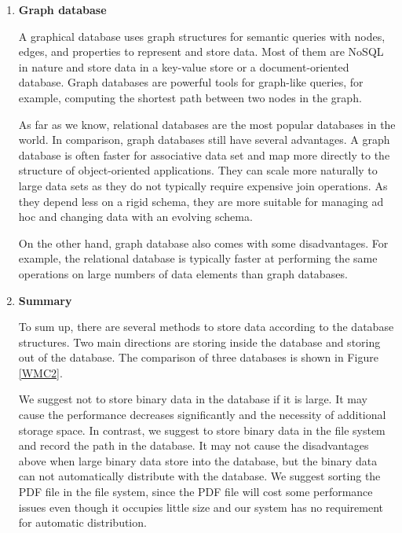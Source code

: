 \begin{enumerate}
	
	
	\item\textbf{Graph database}
	\setlength{\parindent}{1em}	
	
	A graphical database uses graph structures for semantic queries with nodes, edges, and properties to represent and store data.
	Most of them are NoSQL in nature and store data in a key-value store or a document-oriented database.
	Graph databases are powerful tools for graph-like queries, for example, computing the shortest path between two nodes in the graph.
	
	As far as we know, relational databases are the most popular databases in the world.
	In comparison, graph databases still have several advantages.
	A graph database is often faster for associative data set and map more directly to the structure of object-oriented applications.
	They can scale more naturally to large data sets as they do not typically require expensive join operations.
	As they depend less on a rigid schema, they are more suitable for managing ad hoc and changing data with an evolving schema.
	
	On the other hand, graph database also comes with some disadvantages.
	For example, the relational database is typically faster at performing the same operations on large numbers of data elements than graph databases.
	
	\item\textbf{Summary}
	\setlength{\parindent}{1em}	
	
	To sum up, there are several methods to store data according to the database structures.
	Two main directions are storing inside the database and storing out of the database.
	The comparison of three databases is shown in Figure \ref{WMC2}.
	
	We suggest not to store binary data in the database if it is large.
	It may cause the performance decreases significantly and the necessity of additional storage space.
	In contrast, we suggest to store binary data in the file system and record the path in the database.
	It may not cause the disadvantages above when large binary data store into the database, 
	but the binary data can not automatically distribute with the database.
	We suggest sorting the PDF file in the file system, 
	since the PDF file will cost some performance issues even though it occupies little size and our system has no requirement for automatic distribution.
	

\end{enumerate}
